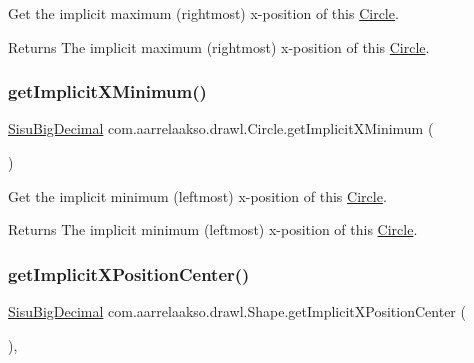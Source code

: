 Get the implicit maximum (rightmost) x-\/position of this \hyperlink{classcom_1_1aarrelaakso_1_1drawl_1_1_circle}{Circle}.

\begin{DoxyReturn}{Returns}
The implicit maximum (rightmost) x-\/position of this \hyperlink{classcom_1_1aarrelaakso_1_1drawl_1_1_circle}{Circle}. 
\end{DoxyReturn}
\mbox{\label{classcom_1_1aarrelaakso_1_1drawl_1_1_circle_ac7ed577bb645a1f136b221feda9e6dfc}} 
\subsubsection{\texorpdfstring{get\+Implicit\+X\+Minimum()}{getImplicitXMinimum()}}
{\footnotesize\ttfamily \hyperlink{classcom_1_1aarrelaakso_1_1drawl_1_1_sisu_big_decimal}{Sisu\+Big\+Decimal} com.\+aarrelaakso.\+drawl.\+Circle.\+get\+Implicit\+X\+Minimum (\begin{DoxyParamCaption}{ }\end{DoxyParamCaption})\hspace{0.3cm}{\ttfamily [protected]}}

Get the implicit minimum (leftmost) x-\/position of this \hyperlink{classcom_1_1aarrelaakso_1_1drawl_1_1_circle}{Circle}.

\begin{DoxyReturn}{Returns}
The implicit minimum (leftmost) x-\/position of this \hyperlink{classcom_1_1aarrelaakso_1_1drawl_1_1_circle}{Circle}. 
\end{DoxyReturn}
\mbox{\label{classcom_1_1aarrelaakso_1_1drawl_1_1_shape_a50c12c30790bd28ec0b71b58f59b1e96}} 
\subsubsection{\texorpdfstring{get\+Implicit\+X\+Position\+Center()}{getImplicitXPositionCenter()}}
{\footnotesize\ttfamily \hyperlink{classcom_1_1aarrelaakso_1_1drawl_1_1_sisu_big_decimal}{Sisu\+Big\+Decimal} com.\+aarrelaakso.\+drawl.\+Shape.\+get\+Implicit\+X\+Position\+Center (\begin{DoxyParamCaption}{ }\end{DoxyParamCaption})\hspace{0.3cm}{\ttfamily [protected]}, {\ttfamily [inherited]}}

